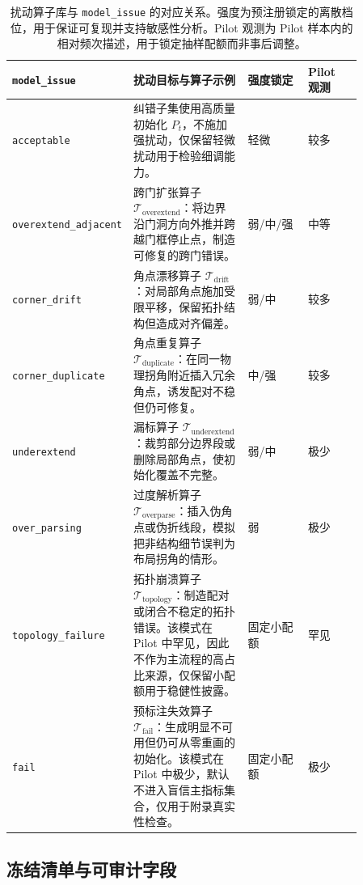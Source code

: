\begin{table}[ht]
\centering
\small
\begin{tabular}{p{0.18\linewidth} p{0.34\linewidth} p{0.18\linewidth} p{0.16\linewidth}}
\toprule
\textbf{\texttt{model\_issue}} & \textbf{扰动目标与算子示例} & \textbf{强度锁定} & \textbf{Pilot 观测}\\
\midrule
\texttt{acceptable} & 纠错子集使用高质量初始化 $P_t$，不施加强扰动，仅保留轻微扰动用于检验细调能力。 & 轻微 & 较多\\
\texttt{overextend\_adjacent} & 跨门扩张算子 $\mathcal{T}_{\mathrm{overextend}}$：将边界沿门洞方向外推并跨越门框停止点，制造可修复的跨门错误。 & 弱/中/强 & 中等\\
\texttt{corner\_drift} & 角点漂移算子 $\mathcal{T}_{\mathrm{drift}}$：对局部角点施加受限平移，保留拓扑结构但造成对齐偏差。 & 弱/中 & 较多\\
\texttt{corner\_duplicate} & 角点重复算子 $\mathcal{T}_{\mathrm{duplicate}}$：在同一物理拐角附近插入冗余角点，诱发配对不稳但仍可修复。 & 中/强 & 较多\\
\texttt{underextend} & 漏标算子 $\mathcal{T}_{\mathrm{underextend}}$：裁剪部分边界段或删除局部角点，使初始化覆盖不完整。 & 弱/中 & 极少\\
\texttt{over\_parsing} & 过度解析算子 $\mathcal{T}_{\mathrm{overparse}}$：插入伪角点或伪折线段，模拟把非结构细节误判为布局拐角的情形。 & 弱 & 极少\\
\texttt{topology\_failure} & 拓扑崩溃算子 $\mathcal{T}_{\mathrm{topology}}$：制造配对或闭合不稳定的拓扑错误。该模式在 Pilot 中罕见，因此不作为主流程的高占比来源，仅保留小配额用于稳健性披露。 & 固定小配额 & 罕见\\
\texttt{fail} & 预标注失效算子 $\mathcal{T}_{\mathrm{fail}}$：生成明显不可用但仍可从零重画的初始化。该模式在 Pilot 中极少，默认不进入盲信主指标集合，仅用于附录真实性检查。 & 固定小配额 & 极少\\
\bottomrule
\end{tabular}
\caption{扰动算子库与 \texttt{model\_issue} 的对应关系。强度为预注册锁定的离散档位，用于保证可复现并支持敏感性分析。Pilot 观测为 Pilot 样本内的相对频次描述，用于锁定抽样配额而非事后调整。}
\label{tab:perturbation-operator-library}
\end{table}

\subsection{冻结清单与可审计字段}\label{app:perturbation-freeze-list}

